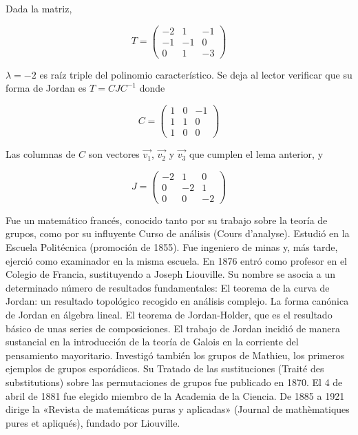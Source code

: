 \begin{example}
Dada la matriz, 

$$T=\left(\begin{array}{ccc} -2 & 1 & -1  \\ -1  & -1 & 0
\\ 0  & 1 & -3
\end{array}
 \right)$$ 
 
\bigskip



$\lambda= -2$  es raíz triple del polinomio característico. Se deja al lector verificar que su forma de Jordan es $T= CJC^{-1}$ donde 

$$C=\left(\begin{array}{ccc} 1 & 0 & -1  \\ 1  & 1 & 0
\\ 1  & 0 & 0
\end{array}
 \right)$$ 
 
 \bigskip
\noindent 
 Las columnas de $C$ son  vectores  $\vec{v_1}$, $\vec{v_2}  $ y $\vec{v_3}$ que cumplen el lema anterior, y
 
$$J=\left(\begin{array}{ccc} -2 & 1 & 0  \\ 0  & -2 & 1
\\ 0  & 0 & -2
\end{array}
 \right)$$  
\end{example} 

\bigskip
{}
\begin{parchment} {Fue un matemático francés, conocido tanto por su trabajo sobre la teoría de grupos, como por su influyente Curso de análisis (Cours d’analyse). Estudió en la Escuela Politécnica (promoción de 1855). Fue ingeniero de minas y, más tarde, ejerció como examinador en la misma escuela. En 1876 entró como profesor en el Colegio de Francia, sustituyendo a Joseph Liouville.
Su nombre se asocia a un determinado número de resultados fundamentales:
El teorema de la curva de Jordan: un resultado topológico recogido en análisis complejo.
La forma canónica de Jordan en álgebra lineal.
El teorema de Jordan-Holder, que es el resultado básico de unas series de composiciones.
El trabajo de Jordan incidió de manera sustancial en la introducción de la teoría de Galois en la corriente del pensamiento mayoritario. Investigó también los grupos de Mathieu, los primeros ejemplos de grupos esporádicos. Su Tratado de las sustituciones (Traité des substitutions) sobre las permutaciones de grupos fue publicado en 1870.
El 4 de abril de 1881 fue elegido miembro de la Academia de la Ciencia.
De 1885 a 1921 dirige la «Revista de matemáticas puras y aplicadas» (Journal de mathèmatiques pures et apliqués), fundado por Liouville. \cite{jordan} }
\end{parchment}

